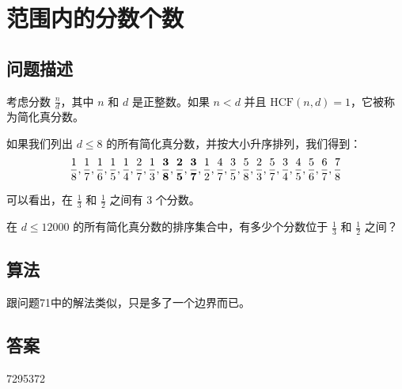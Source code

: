 \section{范围内的分数个数}
\subsection{问题描述}
\begin{tcolorbox}
	考虑分数 \( \frac{n}{d} \)，其中 \( n \) 和 \( d \) 是正整数。如果 \( n < d \) 并且 \( \text{HCF}(n, d) = 1 \)，它被称为简化真分数。

	如果我们列出 \( d \leq 8 \) 的所有简化真分数，并按大小升序排列，我们得到：
	\[ \frac{1}{8}, \frac{1}{7}, \frac{1}{6}, \frac{1}{5}, \frac{1}{4}, \frac{2}{7}, \frac{1}{3}, \frac{\bf 3}{\bf 8},
		\frac{\bf 2}{\bf 5}, \frac{\bf 3}{\bf 7}, \frac{1}{2}, \frac{4}{7}, \frac{3}{5}, \frac{5}{8}, \frac{2}{3}, \frac{5}{7}, \frac{3}{4}, \frac{4}{5}, \frac{5}{6}, \frac{6}{7}, \frac{7}{8} \]

	可以看出，在 \( \frac{1}{3} \) 和 \( \frac{1}{2} \) 之间有 3 个分数。

	在 \( d \leq 12000 \) 的所有简化真分数的排序集合中，有多少个分数位于 \( \frac{1}{3} \) 和 \( \frac{1}{2} \) 之间？
\end{tcolorbox}

\subsection{算法}
跟问题71中的解法类似，只是多了一个边界而已。

\subsection{答案}
7295372
